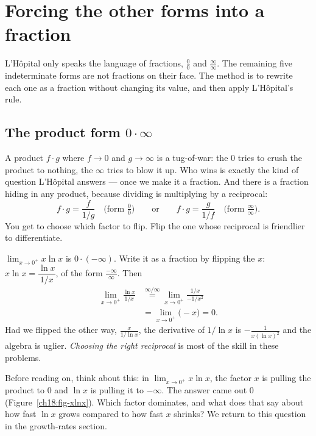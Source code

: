 \section{Forcing the other forms into a fraction}

L'H\^opital only speaks the language of fractions, $\tfrac00$ and
$\tfrac{\infty}{\infty}$. The remaining five indeterminate forms are not fractions on
their face. The method is to rewrite each one as a fraction without
changing its value, and then apply L'H\^opital's rule.

\subsection{The product form $0\cdot\infty$}

A product $f\cdot g$ where $f\to 0$ and $g\to\infty$ is a tug-of-war: the $0$ tries to
crush the product to nothing, the $\infty$ tries to blow it up. Who wins is exactly the
kind of question L'H\^opital answers --- once we make it a fraction. And there is a
fraction hiding in any product, because dividing is multiplying by a reciprocal:
\[
f\cdot g=\frac{f}{1/g}\quad\Big(\text{form }\tfrac00\Big)
\qquad\text{or}\qquad
f\cdot g=\frac{g}{1/f}\quad\Big(\text{form }\tfrac{\infty}{\infty}\Big).
\]
You get to choose which factor to flip. Flip the one whose reciprocal is friendlier to
differentiate.

\begin{example}\label{ch18:ex-xlnx}
$\displaystyle\lim_{x\to 0^+}x\ln x$ is $0\cdot(-\infty)$. Write it as a fraction by
flipping the $x$: $x\ln x=\dfrac{\ln x}{1/x}$, of the form $\tfrac{-\infty}{\infty}$. Then
\begin{align*}
\lim_{x\to 0^+}\frac{\ln x}{1/x}
&\overset{\infty/\infty}{=}\lim_{x\to 0^+}\frac{1/x}{-1/x^2}\\
&=\lim_{x\to 0^+}\big(-x\big)=0.
\end{align*}
Had we flipped the other way, $\tfrac{x}{1/\ln x}$, the derivative of $1/\ln x$ is
$-\tfrac{1}{x(\ln x)^2}$ and the algebra is uglier. \emph{Choosing the right
reciprocal} is most of the skill in these problems.
\end{example}

\begin{walkbox}
Before reading on, think about this: in $\lim_{x\to 0^+}x\ln x$, the factor $x$ is
pulling the product to $0$ and $\ln x$ is pulling it to $-\infty$. The answer came out
$0$ (Figure~\ref{ch18:fig-xlnx}). Which factor dominates, and what does that say about
how fast $\ln x$ grows compared to how fast $x$ shrinks? We return to this question in
the growth-rates section.
\end{walkbox}

